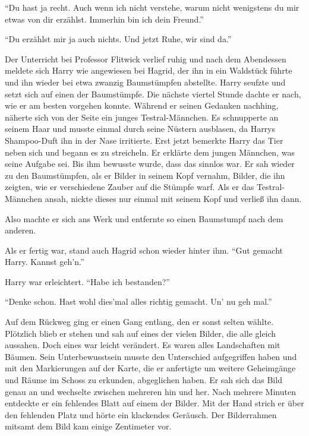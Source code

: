 \enquote{Du hast ja recht. Auch wenn ich nicht verstehe, warum nicht wenigstens du mir etwas von dir erzählst. Immerhin bin ich dein Freund.}

\enquote{Du erzählst mir ja auch nichts. Und jetzt Ruhe, wir sind da.}

Der Unterricht bei Professor Flitwick verlief ruhig und nach dem Abendessen meldete sich Harry wie angewiesen bei Hagrid, der ihn in ein Waldstück führte und ihn wieder bei etwa zwanzig Baumstümpfen abstellte. Harry seufzte und setzt sich auf einen der Baumstümpfe. Die nächste viertel Stunde dachte er nach, wie er am besten vorgehen konnte. Während er seinen Gedanken nachhing, näherte sich von der Seite ein junges Testral-Männchen. Es schnupperte an seinem Haar und musste einmal durch seine Nüstern ausblasen, da Harrys Shampoo-Duft ihn in der Nase irritierte. Erst jetzt bemerkte Harry das Tier neben sich und begann es zu streicheln. Er erklärte dem jungen Männchen, was seine Aufgabe sei. Bis ihm bewusste wurde, dass das sinnlos war. Er sah wieder zu den Baumstümpfen, als er Bilder in seinem Kopf vernahm, Bilder, die ihn zeigten, wie er verschiedene Zauber auf die Stümpfe warf. Als er das Testral-Männchen ansah, nickte dieses nur einmal mit seinem Kopf und verließ ihn dann.

 Also machte er sich ans Werk und entfernte so einen Baumstumpf nach dem anderen.

Als er fertig war, stand auch Hagrid schon wieder hinter ihm. \enquote{Gut gemacht Harry. Kannst geh’n.}

Harry war erleichtert. \enquote{Habe ich bestanden?}

\enquote{Denke schon. Hast wohl dies’mal alles richtig gemacht. Un’ nu geh mal.}

Auf dem Rückweg ging er einen Gang entlang, den er sonst selten wählte. Plötzlich blieb er stehen und sah auf eines der vielen Bilder, die alle gleich aussahen. Doch eines war leicht verändert. Es waren alles Landschaften mit Bäumen. Sein Unterbewusstsein musste den Unterschied aufgegriffen haben und mit den Markierungen auf der Karte, die er anfertigte um weitere Geheimgänge und Räume im Schoss zu erkunden, abgeglichen haben. Er sah sich das Bild genau an und wechselte zwischen mehreren hin und her. Nach mehrere Minuten entdeckte er ein fehlendes Blatt auf einem der Bilder. Mit der Hand strich er über den fehlenden Platz und hörte ein klackendes Geräusch. Der Bilderrahmen mitsamt dem Bild kam einige Zentimeter vor.

